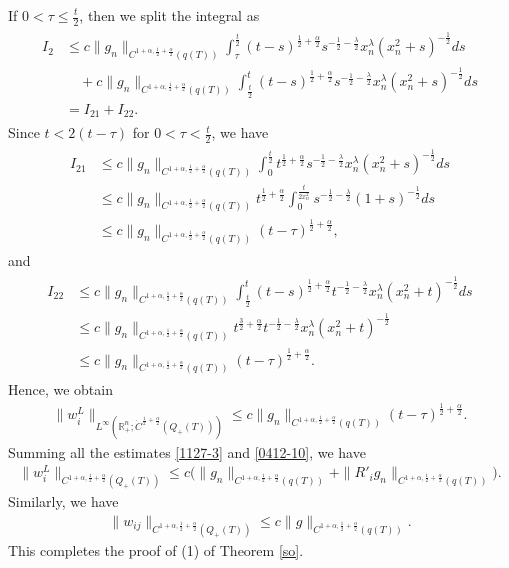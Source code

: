 \documentclass{amsart}
\numberwithin{equation}{section}
\newcommand{\R}{{ \mathbb R}^n}
\newcommand {\la}{\lambda}
\newcommand {\al}{\alpha}
\begin{document}
If $0 < \tau \leq \frac{t}2$, then we split the integral as
\begin{align*}
\begin{split}
I_2 &\leq c \| g_n \|_{C^{1 +\al, \frac12 + \frac{\al}2}(q(T))} \int_\tau^{\frac{t}2} (t -s)^{\frac12 + \frac{\al}2} s^{-\frac12 -\frac{\la}2} x_n^\la (x_n^2 + s)^{-\frac12} ds \\
&\quad + c \| g_n \|_{C^{1 +\al, \frac12 + \frac{\al}2}(q(T))} \int_{\frac{t}2}^t (t -s)^{\frac12 + \frac{\al}2} s^{-\frac12 -\frac{\la}2} x_n^\la (x_n^2 + s)^{-\frac12} ds \\
&= I_{21} + I_{22}.
\end{split}
\end{align*}
Since $t < 2(t -\tau)$ for $0 < \tau < \frac{t}2$, we have 
\begin{align*}
\begin{split}
I_{21} &\leq c \| g_n \|_{C^{1 +\al, \frac12 + \frac{\al}2}(q(T))} \int_0^{\frac{t}2} t^{\frac12 + \frac{\al}2} s^{-\frac12 -\frac{\la}2} x_n^\la (x_n^2 + s)^{-\frac12} ds \\
&\leq c \| g_n \|_{C^{1 +\al, \frac12 + \frac{\al}2}(q(T))} t^{\frac12 + \frac{\al}2} \int_0^{\frac{t}{2x_n^2}} s^{-\frac12 -\frac{\la}2} (1 + s)^{-\frac12} ds \\
&\leq c \| g_n \|_{C^{1 +\al, \frac12 + \frac{\al}2}(q(T))} (t-\tau)^{\frac12 + \frac{\al}2},
\end{split}
\end{align*}
and
\begin{align*}
\begin{split}
I_{22} &\leq c \| g_n \|_{C^{1 +\al, \frac12 + \frac{\al}2}(q(T))} \int_{\frac{t}2}^t (t -s)^{\frac12 + \frac{\al}2} t^{-\frac12 -\frac{\la}2} x_n^\la (x_n^2 + t)^{-\frac12} ds \\
&\leq c \| g_n \|_{C^{1 +\al, \frac12 + \frac{\al}2}(q(T))} t^{\frac32 + \frac{\al}2} t^{-\frac12 -\frac{\la}2} x_n^\la (x_n^2 + t)^{-\frac12} \\
&\leq c \| g_n \|_{C^{1 +\al, \frac12 + \frac{\al}2}(q(T))} (t-\tau)^{\frac12 + \frac{\al}2}.
\end{split}
\end{align*}
Hence, we obtain
\begin{align}\label{0412-10}
\| w^L_i \|_{L^\infty(\R_+; \dot{C}^{\frac12 +\frac{\al}2}(Q_+(T)))} \leq c \| g_n \|_{C^{1 +\al, \frac12 + \frac{\al}2}(q(T))} (t-\tau)^{\frac12 + \frac{\al}2}. 
\end{align}
Summing all the estimates \eqref{1127-3} and \eqref{0412-10}, we have 
\begin{align*}
\| w_{i}^L \|_{C^{1+\al, \frac12 + \frac{\al}2}(Q_+(T))} \leq c \Big( \| g_n \|_{C^{1+\al, \frac12 +\frac{\al}2}(q(T))} + \| R'_i g_n \|_{C^{1+\al, \frac12 +\frac{\al}2}(q(T))} \Big).
\end{align*}
Similarly, we have 
\begin{align*}
\| w_{ij} \|_{C^{1+\al, \frac12 + \frac{\al}2}(Q_+(T))} \leq c\| g \|_{C^{1+\al, \frac12 +\frac{\al}2}(q(T))}.
\end{align*}
This completes the proof of (1) of Theorem \ref{so}.
  
\end{document}
